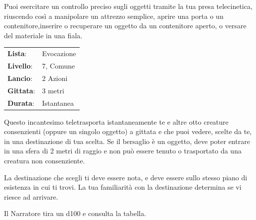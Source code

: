\begin{multicols}{2}
Puoi esercitare un controllo preciso sugli oggetti tramite la tua presa telecinetica, riuscendo così a manipolare un attrezzo semplice, aprire una porta o un contenitore,inserire o recuperare un oggetto da un contenitore aperto, o versare del materiale in una fiala.

\noindent\begin{tabularx}{\linewidth}{p{1.3cm}X}
	\rowcolor{gray!20}\textbf{Lista}: & Evocazione \\
	\textbf{Livello}: & 7, Comune \\
	\rowcolor{gray!20}\textbf{Lancio}: & 2 Azioni \\
	\textbf{Gittata}: & 3 metri \\
	\rowcolor{gray!20}\textbf{Durata}: & Istantanea \\
\end{tabularx}\smallskip

Questo incantesimo teletrasporta istantaneamente te e altre otto creature consenzienti (oppure un singolo oggetto) a gittata e che puoi vedere, scelte da te, in una destinazione di tua scelta. Se il bersaglio è un oggetto, deve poter entrare in una sfera di 2 metri di raggio e non può essere tenuto o trasportato da una creatura non consenziente.

La destinazione che scegli ti deve essere nota, e deve essere sullo stesso piano di esistenza in cui ti trovi. La tua familiarità con la destinazione determina se vi riesce ad arrivare.

Il Narratore tira un d100 e consulta la tabella.


\end{multicols}

